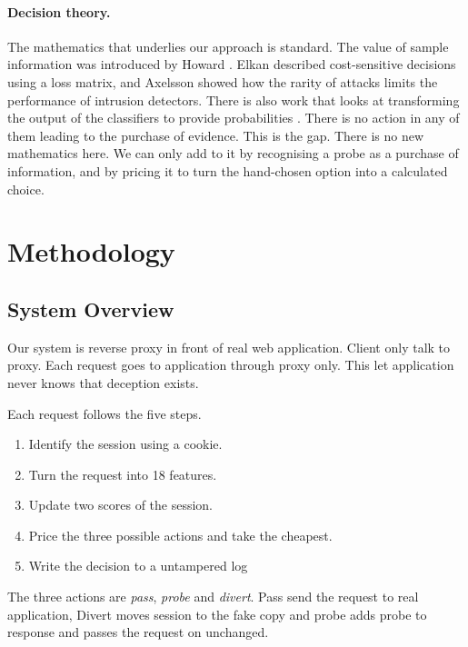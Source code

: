 \documentclass[runningheads]{llncs}
\begin{document}
\paragraph{Decision theory.} The mathematics that underlies our approach is standard. The value of sample information was introduced by Howard \cite{howard1966information}. Elkan \cite{elkan2001foundations} described cost-sensitive decisions using a loss matrix, and Axelsson \cite{axelsson2000baserate} showed how the rarity of attacks limits the performance of intrusion detectors. There is also work that looks at transforming the output of the classifiers to provide probabilities \cite{zadrozny2002transforming}. There is no action in any of them leading to the purchase of evidence. This is the gap. There is no new mathematics here. We can only add to it by recognising a probe as a purchase of information, and by pricing it to turn the hand-chosen option into a calculated choice.



\section{Methodology}

\subsection{System Overview}
Our system is reverse proxy in front of real web application. Client only talk to proxy. Each request goes to application through proxy only. This let application never knows that deception exists. 

Each request follows the five steps.
\begin{enumerate}
\item Identify the session using a cookie.
\item Turn the request into 18 features.
\item Update two scores of the session.
\item Price the three possible actions and take the cheapest.
\item Write the decision to a untampered log
\end{enumerate}

The three actions are \emph{pass}, \emph{probe} and \emph{divert}. Pass send the request to real application, Divert moves session to the fake copy and probe adds probe to response and passes the request on unchanged. 
\end{document}
